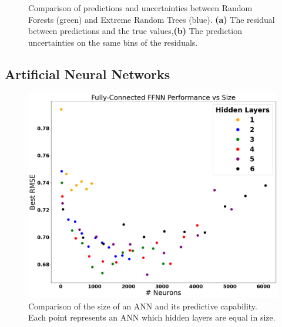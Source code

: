 \documentclass[a4paper, twoside, final, 12pt]{article}
\begin{document}
{\begin{figure}[h!]
\begin{subfigure}{0.48\linewidth}
		\caption{}
		\label{subfig:RF_UQ}
	\end{subfigure}
		\caption{Comparison of predictions and uncertainties between Random Forests (green) and Extreme Random Trees (blue). \textbf{(a)} The residual between predictions and the true values,\textbf{(b)} The prediction uncertainties on the same bins of the residuals. }
	\label{fig:RF_Preds}
\end{figure}


\subsection{Artificial Neural Networks}

\begin{figure}
	\centering
	\includegraphics[scale=0.2]{./src/ANN_performace_size}
	\caption{Comparison of the size of an ANN and its predictive capability. Each point represents an ANN which hidden layers are equal in size.}
	\label{fig:ANN_dim}
\end{figure}
}
\end{document}
